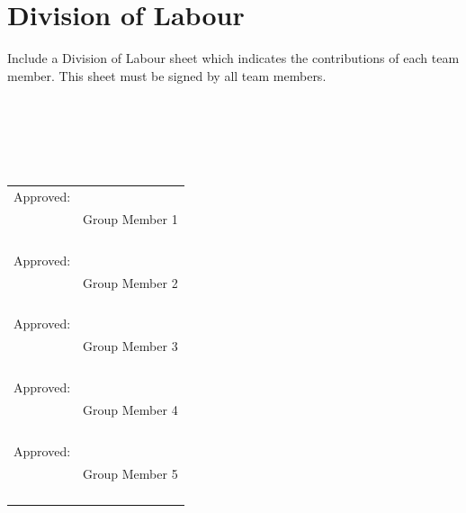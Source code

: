 \documentclass[]{article}
\begin{document}
\newpage
\appendix
\section{Division of Labour}
\label{sec:division_of_labour}
Include a Division of Labour sheet which indicates the contributions of each team member. This sheet must be signed by all team members.
\\\\\\\\\\\\
\begin{tabular}{@{}p{.5in}p{4in}@{}}
Approved: & \hrulefill \\
& Group Member 1 \\\\\\\\\\
Approved: & \hrulefill \\
& Group Member 2 \\\\\\\\\\
Approved: & \hrulefill \\
& Group Member 3 \\\\\\\\\\
Approved: & \hrulefill \\
& Group Member 4 \\\\\\\\\\
Approved: & \hrulefill \\
& Group Member 5 \\\\\\\\\\
\end{tabular}

\newpage
\end{document}

